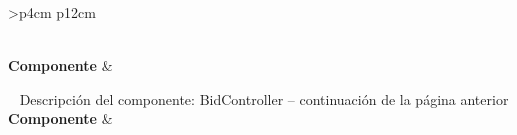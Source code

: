 \begin{longtable}{
    >{}p{4cm}
    p{12cm}
    }
    \caption{Descripción del componente: BidController} \label{table:descripcion_bidcontroller} \\
    \toprule
    \textbf{Componente} &  \\
    \endfirsthead
    
    {{ \tablename\ \thetable{} Descripción del componente: BidController -- continuación de la página anterior}} \\
    \toprule
    \textbf{Componente} &  \\
    \midrule
    \endhead
    
    \midrule
     \\ 
    \endfoot
    
    \bottomrule
    \endlastfoot
    

\end{longtable}
